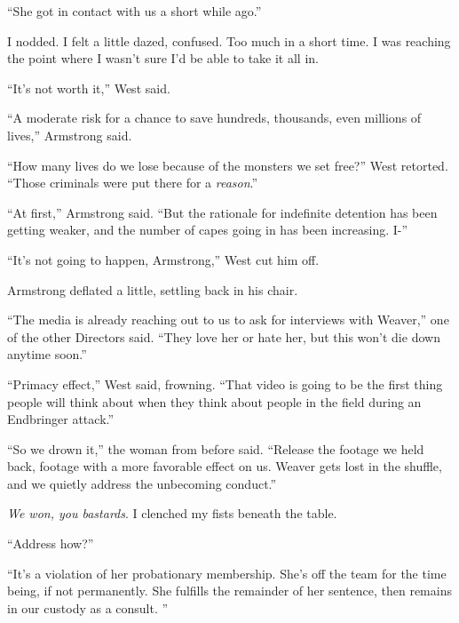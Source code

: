 ``She got in contact with us a short while ago.''



I nodded.  I felt a little dazed, confused.  Too much in a short time.  I was reaching the point where I wasn't sure I'd be able to take it all in.



``It's not worth it,'' West said.



``A moderate risk for a chance to save hundreds, thousands, even millions of lives,'' Armstrong said.



``How many lives do we lose because of the monsters we set free?''  West retorted.  ``Those criminals were put there for a \emph{reason}.''



``At first,'' Armstrong said.  ``But the rationale for indefinite detention has been getting weaker, and the number of capes going in has been increasing.  I-''



``It's not going to happen, Armstrong,'' West cut him off.



Armstrong deflated a little, settling back in his chair.



``The media is already reaching out to us to ask for interviews with Weaver,'' one of the other Directors said.  ``They love her or hate her, but this won't die down anytime soon.''



``Primacy effect,'' West said, frowning.  ``That video is going to be the first thing people will think about when they think about people in the field during an Endbringer attack.''



``So we drown it,'' the woman from before said.  ``Release the footage we held back, footage with a more favorable effect on us.  Weaver gets lost in the shuffle, and we quietly address the unbecoming conduct.''



\emph{We won, you bastards}.  I clenched my fists beneath the table.



``Address how?''



``It's a violation of her probationary membership.  She's off the team for the time being, if not permanently.  She fulfills the remainder of her sentence, then remains in our custody as a consult.  ''



